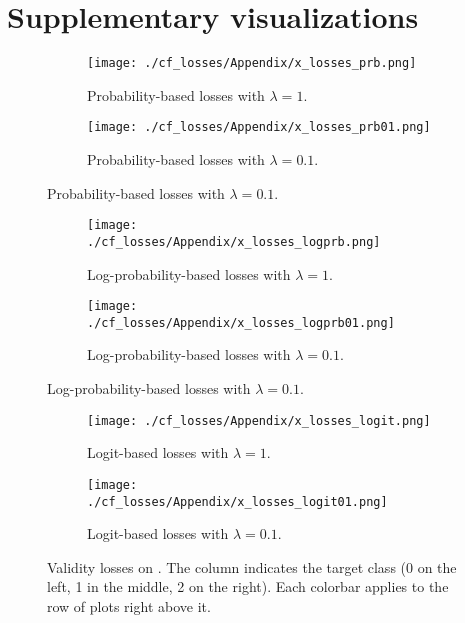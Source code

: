 \documentclass[../main.tex]{subfiles}
\begin{document}
\chapter{Supplementary visualizations}
\label{ch:plots}

\begin{figure}
    \centering

    \begin{subfigure}[b]{\textwidth}
        \centering
        \texttt{[image: ./cf\_losses/Appendix/x\_losses\_prb.png]}
        \caption{Probability-based losses with $\lambda=1$.}
    \end{subfigure}
    \begin{subfigure}[b]{\textwidth}
        \centering
        \texttt{[image: ./cf\_losses/Appendix/x\_losses\_prb01.png]}
        \caption{Probability-based losses with $\lambda=0.1$.}
    \end{subfigure}
\end{figure}
\begin{figure}\ContinuedFloat
    \centering
    \begin{subfigure}[b]{\textwidth}
        \centering
        \texttt{[image: ./cf\_losses/Appendix/x\_losses\_logprb.png]}
        \caption{Log-probability-based losses with $\lambda=1$.}
    \end{subfigure}
    \begin{subfigure}[b]{\textwidth}
        \centering
        \texttt{[image: ./cf\_losses/Appendix/x\_losses\_logprb01.png]}
        \caption{Log-probability-based losses with $\lambda=0.1$.}
    \end{subfigure}
\end{figure}
\begin{figure}\ContinuedFloat
    \begin{subfigure}[b]{\textwidth}
        \centering
        \texttt{[image: ./cf\_losses/Appendix/x\_losses\_logit.png]}
        \caption{Logit-based losses with $\lambda=1$.}
    \end{subfigure}
    \begin{subfigure}[b]{\textwidth}
        \centering
        \texttt{[image: ./cf\_losses/Appendix/x\_losses\_logit01.png]}
        \caption{Logit-based losses with $\lambda=0.1$.}
    \end{subfigure}

    \caption{Validity losses on \CakeOnSea. The column indicates the target class (0 on the left, 1 in the middle, 2 on the right). Each colorbar applies to the row of plots right above it.}
\end{figure}
\end{document}
